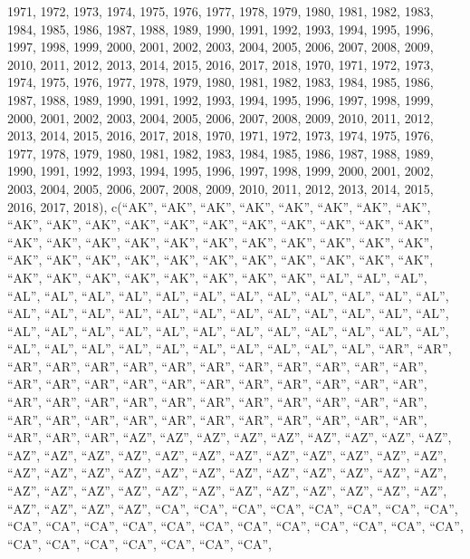 \documentclass[
]{article}
\begin{document}
1971, 1972, 1973, 1974, 1975, 1976, 1977, 1978, 1979, 1980, 1981, 1982,
1983, 1984, 1985, 1986, 1987, 1988, 1989, 1990, 1991, 1992, 1993, 1994,
1995, 1996, 1997, 1998, 1999, 2000, 2001, 2002, 2003, 2004, 2005, 2006,
2007, 2008, 2009, 2010, 2011, 2012, 2013, 2014, 2015, 2016, 2017, 2018,
1970, 1971, 1972, 1973, 1974, 1975, 1976, 1977, 1978, 1979, 1980, 1981,
1982, 1983, 1984, 1985, 1986, 1987, 1988, 1989, 1990, 1991, 1992, 1993,
1994, 1995, 1996, 1997, 1998, 1999, 2000, 2001, 2002, 2003, 2004, 2005,
2006, 2007, 2008, 2009, 2010, 2011, 2012, 2013, 2014, 2015, 2016, 2017,
2018, 1970, 1971, 1972, 1973, 1974, 1975, 1976, 1977, 1978, 1979, 1980,
1981, 1982, 1983, 1984, 1985, 1986, 1987, 1988, 1989, 1990, 1991, 1992,
1993, 1994, 1995, 1996, 1997, 1998, 1999, 2000, 2001, 2002, 2003, 2004,
2005, 2006, 2007, 2008, 2009, 2010, 2011, 2012, 2013, 2014, 2015, 2016,
2017, 2018), c(``AK'', ``AK'', ``AK'', ``AK'', ``AK'', ``AK'', ``AK'',
``AK'', ``AK'', ``AK'', ``AK'', ``AK'', ``AK'', ``AK'', ``AK'', ``AK'',
``AK'', ``AK'', ``AK'', ``AK'', ``AK'', ``AK'', ``AK'', ``AK'', ``AK'',
``AK'', ``AK'', ``AK'', ``AK'', ``AK'', ``AK'', ``AK'', ``AK'', ``AK'',
``AK'', ``AK'', ``AK'', ``AK'', ``AK'', ``AK'', ``AK'', ``AK'', ``AK'',
``AK'', ``AK'', ``AK'', ``AK'', ``AK'', ``AK'', ``AL'', ``AL'', ``AL'',
``AL'', ``AL'', ``AL'', ``AL'', ``AL'', ``AL'', ``AL'', ``AL'', ``AL'',
``AL'', ``AL'', ``AL'', ``AL'', ``AL'', ``AL'', ``AL'', ``AL'', ``AL'',
``AL'', ``AL'', ``AL'', ``AL'', ``AL'', ``AL'', ``AL'', ``AL'', ``AL'',
``AL'', ``AL'', ``AL'', ``AL'', ``AL'', ``AL'', ``AL'', ``AL'', ``AL'',
``AL'', ``AL'', ``AL'', ``AL'', ``AL'', ``AL'', ``AL'', ``AL'', ``AL'',
``AL'', ``AR'', ``AR'', ``AR'', ``AR'', ``AR'', ``AR'', ``AR'', ``AR'',
``AR'', ``AR'', ``AR'', ``AR'', ``AR'', ``AR'', ``AR'', ``AR'', ``AR'',
``AR'', ``AR'', ``AR'', ``AR'', ``AR'', ``AR'', ``AR'', ``AR'', ``AR'',
``AR'', ``AR'', ``AR'', ``AR'', ``AR'', ``AR'', ``AR'', ``AR'', ``AR'',
``AR'', ``AR'', ``AR'', ``AR'', ``AR'', ``AR'', ``AR'', ``AR'', ``AR'',
``AR'', ``AR'', ``AR'', ``AR'', ``AR'', ``AZ'', ``AZ'', ``AZ'', ``AZ'',
``AZ'', ``AZ'', ``AZ'', ``AZ'', ``AZ'', ``AZ'', ``AZ'', ``AZ'', ``AZ'',
``AZ'', ``AZ'', ``AZ'', ``AZ'', ``AZ'', ``AZ'', ``AZ'', ``AZ'', ``AZ'',
``AZ'', ``AZ'', ``AZ'', ``AZ'', ``AZ'', ``AZ'', ``AZ'', ``AZ'', ``AZ'',
``AZ'', ``AZ'', ``AZ'', ``AZ'', ``AZ'', ``AZ'', ``AZ'', ``AZ'', ``AZ'',
``AZ'', ``AZ'', ``AZ'', ``AZ'', ``AZ'', ``AZ'', ``AZ'', ``AZ'', ``AZ'',
``CA'', ``CA'', ``CA'', ``CA'', ``CA'', ``CA'', ``CA'', ``CA'', ``CA'',
``CA'', ``CA'', ``CA'', ``CA'', ``CA'', ``CA'', ``CA'', ``CA'', ``CA'',
``CA'', ``CA'', ``CA'', ``CA'', ``CA'', ``CA'', ``CA'', ``CA'', ``CA'',
\end{document}

